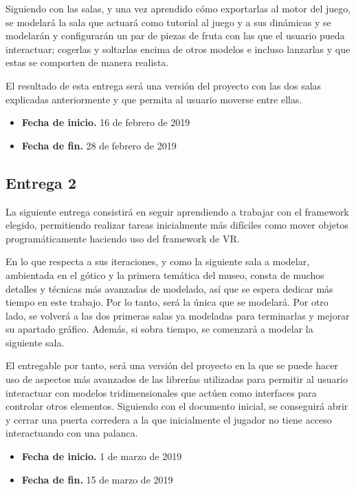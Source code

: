 Siguiendo con las salas, y una vez aprendido cómo exportarlas al motor del juego, se modelará la sala que actuará como tutorial al juego y a sus dinámicas y se modelarán y configurarán un par de piezas de fruta con las que el usuario pueda interactuar; cogerlas y soltarlas encima de otros modelos e incluso lanzarlas y que estas se comporten de manera realista.

El resultado de esta entrega será una versión del proyecto con las dos salas explicadas anteriormente y que permita al usuario moverse entre ellas.

\begin{itemize}
    \item \textbf{Fecha de inicio.} 16 de febrero de 2019
    \item \textbf{Fecha de fin.} 28 de febrero de 2019
\end{itemize}

\subsection{Entrega 2}

La siguiente entrega consistirá en seguir aprendiendo a trabajar con el framework elegido, permitiendo realizar tareas inicialmente más difíciles como mover objetos programáticamente haciendo uso del framework de \acs{VR}.

En lo que respecta a sus iteraciones, y como la siguiente sala a modelar, ambientada en el gótico y la primera temática del museo, consta de muchos detalles y técnicas más avanzadas de modelado, así que se espera dedicar más tiempo en este trabajo. Por lo tanto, será la única que se modelará. Por otro lado, se volverá a las dos primeras salas ya modeladas para terminarlas y mejorar su apartado gráfico. Además, si sobra tiempo, se comenzará a modelar la siguiente sala.

El entregable por tanto, será una versión del proyecto en la que se puede hacer uso de aspectos más avanzados de las librerías utilizadas para permitir al usuario interactuar con modelos tridimensionales que actúen como interfaces para controlar otros elementos. Siguiendo con el documento inicial, se conseguirá abrir y cerrar una puerta corredera a la que inicialmente el jugador no tiene acceso interactuando con una palanca.

\begin{itemize}
    \item \textbf{Fecha de inicio.} 1 de marzo de 2019
    \item \textbf{Fecha de fin.} 15 de marzo de 2019
\end{itemize}

